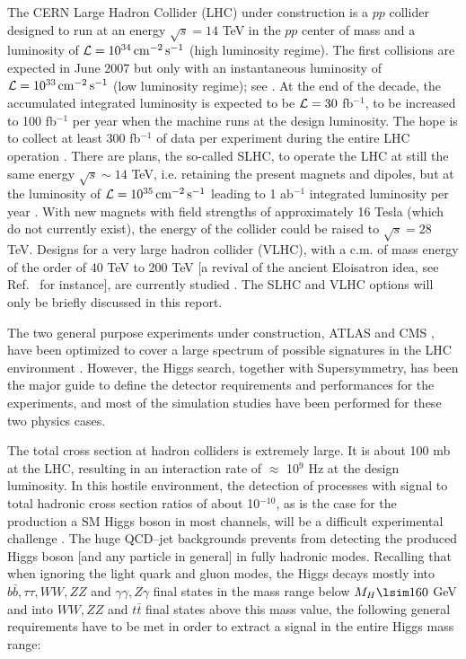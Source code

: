 The CERN Large Hadron Collider (LHC) under construction is a $pp$ collider
designed to run at an energy $\sqrt{s}=14$ TeV in the $pp$ center of mass and a
luminosity of ${\cal L}=10^{34}\, {\rm cm}^{-2}\, {\rm s}^{-1}$ (high
luminosity regime). The first collisions are expected in June 2007 but only
with an instantaneous luminosity of ${\cal L}=10^{33\, }{\rm cm}^{-2} \, {\rm
s}^{-1}$ (low luminosity regime); see \cite{LHC-status,Vienna}. At the end of
the decade, the accumulated integrated luminosity is expected to be ${\cal L}=
30$ fb$^{-1}$, to be increased to 100 fb$^{-1}$ per year when the machine runs
at the design luminosity. The hope is to collect at least 300 fb$^{-1}$ of data
per experiment during the entire LHC operation \cite{LHC-status}. There are
plans, the so-called SLHC, to operate the LHC at still the same energy
$\sqrt{s} \sim 14$ TeV, i.e. retaining the present magnets and dipoles, but at
the luminosity of ${\cal L}=10^{35}\, {\rm cm}^{-2} \, {\rm s}^{-1}$ leading to
1 ab$^{-1}$ integrated luminosity per year \cite{SLHC,SLHC+VLHC,Snowmass2001}. 
With new magnets with field strengths of approximately 16 Tesla (which do not
currently exist), the energy of the collider could be raised to $\sqrt{s}=28$
TeV.  Designs for a very large hadron collider (VLHC), with a c.m. of mass
energy of the order of 40 TeV to 200 TeV [a revival of the ancient Eloisatron
idea, see Ref.~\cite{LaThuile} for instance], are currently studied
\cite{VLHC0,VLHC}.  The SLHC and VLHC options will only be briefly discussed in
this report.\s

The two general purpose experiments under construction, ATLAS
\cite{ATLAS-TP,ATLAS-TDR} and CMS \cite{CMS-TDR,CMS-TDR-True}, have been
optimized to cover a large spectrum of possible signatures in the LHC
environment \cite{CMS+ATLAS-Vienna}.  However, the Higgs search, together with
Supersymmetry, has been the major guide to define the detector requirements and
performances for the experiments, and most of the simulation studies have been
performed for these two physics cases.\s

The total cross section at hadron colliders is extremely large. It is about 100
mb at the LHC, resulting in an interaction rate of $\approx$ 10$^{9}$ Hz at the
design luminosity. In this hostile environment, the detection of processes with
signal to total hadronic cross section ratios of about 10$^{-10}$, as is the
case for the production a SM Higgs boson in most channels, will be a difficult
experimental challenge
\cite{HiggsLHC,HiggsLHC0,ATLAS-review,CMS-review,ATLAS+CMS,LHC-Vienna,Houches19
99,Houches 2001,Houches2003}.  The huge QCD--jet backgrounds prevents from
detecting the produced Higgs boson [and any particle in general] in fully
hadronic modes.  Recalling that when ignoring the light quark and gluon modes,
the Higgs decays mostly into $b\bar b, \tau \tau, WW, ZZ$ and $\gamma \gamma,
Z\gamma$ final states in the mass range below $M_H \lsim 160$ GeV and into
$WW,ZZ$ and $t\bar t$ final states above  this mass value, the following
general requirements have to be met in order to extract a signal in the entire
Higgs mass range: \s

